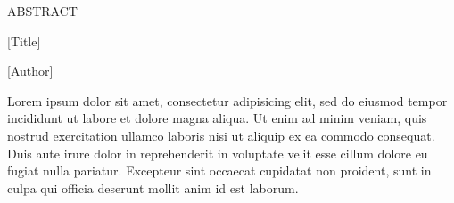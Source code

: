 
\thispagestyle{empty} %
\setcounter{page}{0} %
\vspace*{0.5cm}
\begin{center}
  ABSTRACT %

  [Title]

  [Author]
\end{center}

Lorem ipsum dolor sit amet, consectetur adipisicing elit, sed do eiusmod tempor incididunt ut labore et dolore magna aliqua. Ut enim ad minim veniam, quis nostrud exercitation ullamco laboris nisi ut aliquip ex ea commodo consequat. Duis aute irure dolor in reprehenderit in voluptate velit esse cillum dolore eu fugiat nulla pariatur. Excepteur sint occaecat cupidatat non proident, sunt in culpa qui officia deserunt mollit anim id est laborum.
